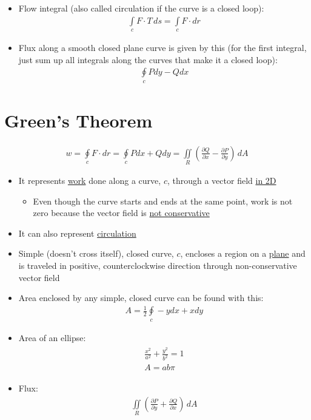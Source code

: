 \documentclass{article}
\begin{document}
\begin{itemize}
\begin{enumerate}
  \end{enumerate}
  \item Flow integral (also called circulation if the curve is a closed loop):
  \begin{align}
    \int\limits_c F \cdot T \, ds = \int\limits_c F \cdot dr
  \end{align}
\item Flux along a smooth closed plane curve is given by this (for the first integral, just sum up all integrals along the curves that make it a closed loop):
  \begin{align}
    \oint\limits_c Pdy - Qdx
  \end{align}
\end{itemize}


\section{Green's Theorem}
  \begin{align}
    w = \oint\limits_c F\cdot dr = \oint\limits_c Pdx + Qdy = \iint\limits_R \left( \frac{\partial Q}{\partial x} - \frac{\partial P}{\partial y} \right) \, dA
  \end{align}
\begin{itemize}
  \item It represents \underline{work} done along a curve, $c$, through a vector field \underline{in 2D}
  \begin{itemize}
    \item Even though the curve starts and ends at the same point, work is not zero because the vector field is \underline{not conservative}
  \end{itemize}
  \item It can also represent \underline{circulation}
  \item Simple (doesn't cross itself), closed curve, $c$, encloses a region on a \underline{plane} and is traveled in positive, counterclockwise direction through non-conservative vector field
  \item Area enclosed by any simple, closed curve can be found with this:
  \begin{align}
    A = \frac{1}{2}\oint\limits_c -ydx + xdy
  \end{align}
  \item Area of an ellipse:
  \begin{align}
    \begin{split}
      \frac{x^2}{a^2} + \frac{y^2}{b^2} = 1 \\
      A = ab\pi
    \end{split}
  \end{align}
  \item Flux:
  \begin{align}
    \iint\limits_R \left( \frac{\partial P}{\partial y} + \frac{\partial Q}{\partial x} \right) \, dA
  \end{align}
\end{itemize}
\end{document}
